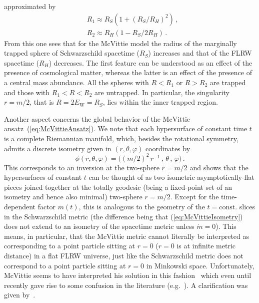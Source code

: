 \documentclass
[rmp,aps,twocolumn,showpacs,preprintnumbers,amsmath,amssymb]{revtex4}
\theoremstyle{plain}
\theoremstyle{definition}
\theoremstyle{remark}
\newcommand{\sss}{\scriptscriptstyle}
\newcommand{\ind}[1]{{\sss \text{#1}}}        %
\begin{document}
approximated by 
%
\begin{subequations}\label{eq:McV-trapped}
\begin{align}
  &R_1 \approx R_S \left( 1 + (R_S/R_H)^2 \right)\,, 
\label{eq:McV-trapped-1}\\
  &R_2 \approx R_H \left( 1 - R_S/2R_H \right)  \,.  
\label{eq:McV-trapped-2}
\end{align}
\end{subequations}
%
From this one sees that for the McVittie model the radius of the marginally 
trapped sphere of Schwarzschild spacetime ($R_S$) increases and that of the 
FLRW spacetime ($R_H$) decreases. The first feature can be understood as an 
effect of the presence of cosmological matter, whereas the latter is an 
effect of the presence of a central mass abundance. 
All the spheres with $R<R_1$ or $R>R_2$ are trapped and those with 
$R_1<R<R_2$ are untrapped. In particular, the singularity $r=m/2$, that is 
$R=2E_\ind{W}=R_S$, lies within the inner trapped region. 

Another aspect concerns the global behavior of the McVittie 
ansatz~(\ref{eq:McVittieAnsatz}). We note that each hypersurface of constant 
time $t$ is a complete Riemannian manifold, which, besides the rotational 
symmetry, admits a discrete isometry given in $(r,\theta,\varphi)$ 
coordinates by 
%
\begin{equation}\label{eq:McVittieIsometry}
  \phi(r,\theta,\varphi) = 
  \bigl((m/2)^2\,r^{-1}\,,\,\theta\,,\,\varphi\bigr)\,.
\end{equation} 
%
This corresponds to an inversion at the two-sphere $r=m/2$ and shows that 
the hypersurfaces of constant $t$ can be thought of as two isometric 
asymptotically-flat pieces joined together at the totally geodesic (being 
a fixed-point set of an isometry and hence also minimal) two-sphere $r=m/2$. 
Except for the time-dependent factor $m(t)$, this is analogous to the
geometry of the  $t=\mathrm{const.}$ slices in the Schwarzschild metric 
(the difference being that (\ref{eq:McVittieIsometry}) does not extend to 
an isometry of the spacetime metric unless $\dot m=0$). This means, in 
particular, that the McVittie metric cannot literally be interpreted as 
corresponding to a point particle sitting at $r=0$ ($r=0$ is at infinite 
metric distance) in a flat FLRW universe, just like the Schwarzschild metric 
does not correspond to a point particle sitting at $r=0$ in Minkowski space. 
Unfortunately, McVittie seems to have interpreted his solution in this 
fashion~\cite{McVittie:1933} which even until recently gave rise to some 
confusion in the literature 
(e.g.~\cite{Gautreau:1984b,Sussman:1988,Ferraris.etal:1996}). 
A clarification was given by~\cite{Nolan:1999a}. 
\end{document}
